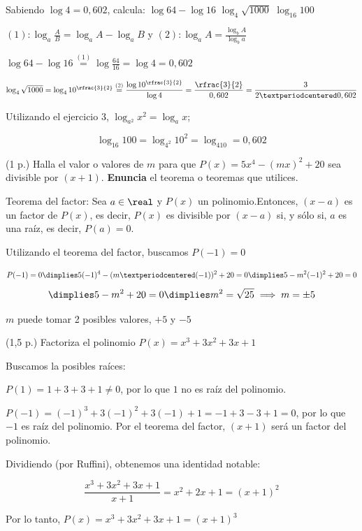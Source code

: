 \documentclass[palatino,nosec]{Docencia}
\begin{document}
\begin{problem}
Sabiendo $\log 4 = 0,602$, calcula:
\ppart $\log64 - \log16$
\ppart $\log_4 \sqrt{1000}$
\ppart $\log_16 100$
\solution

$(1): \log_a\frac{A}{B} = \log_aA - \log_aB$ y $(2): \log_aA = \frac{\log_bA}{\log_ba} $

\spart $\log64 - \log16 \overset{(1)}{=} \log{\frac{64}{16}} = \log 4 = 0,602$

\spart $\log_4\sqrt{1000} = \log_410^{\rfrac{3}{2}} \overset{(2)}{=} \displaystyle\frac{\log 10^{\rfrac{3}{2}}}{\log 4} = \frac{\rfrac{3}{2}}{0,602} = \frac{3}{2·0,602}$

\spart Utilizando el ejercicio 3, $\log_{a^2}x^2 = \log_ax$; 

\[
\log_{16} 100 = \log_{4^2}10^2 = \log_410=0,602
\]
\end{problem}



\begin{problem} (1 p.)
Halla el valor o valores de $m$ para que $P(x) = 5x^4 - (mx)^2 + 20$ sea divisible por $(x+1)$. \textbf{Enuncia} el teorema o teoremas que utilices.

\solution

Teorema del factor: Sea $a\in\real$ y $P(x)$ un polinomio.Entonces, $(x-a)$ es un factor de $P(x)$, es decir, $P(x)$ es divisible por $(x-a)$ si, y sólo si, $a$ es una raíz, es decir, $P(a) = 0$.

Utilizando el teorema del factor, buscamos $P(-1) = 0$

\[
	P(-1) = 0 \dimplies 5(-1)^4 - (m·(-1))^2 + 20 = 0 \dimplies 5-m^2(-1)^2+20 = 0 
\]
\[
	\dimplies 5-m^2+20=0 \dimplies m^2 = \sqrt{25} \implies m=\pm 5
\]

$m$ puede tomar 2 posibles valores, $+5$ y $-5$

\end{problem}


\begin{problem} (1,5 p.) 
Factoriza el polinomio $P(x) = x^3+3x^2+3x+1$
\solution

Buscamos la posibles raíces:

$P(1) = 1+3+3+1 ≠ 0$, por lo que $1$ no es raíz del polinomio.

$P(-1) = (-1)^3 + 3(-1)^2+3(-1)+1 = -1+3-3+1 = 0$, por lo que $-1$ es raíz del polinomio. Por el teorema del factor, $(x+1)$ será un factor del polinomio.

Dividiendo (por Ruffini), obtenemos una identidad notable: 

\[
	\frac{x^3+3x^2+3x+1}{x+1} = x^2+2x+1 = (x+1)^2
\]

Por lo tanto, $P(x) = x^3+3x^2+3x+1 = (x+1)^3$
\end{problem}
\end{document}
